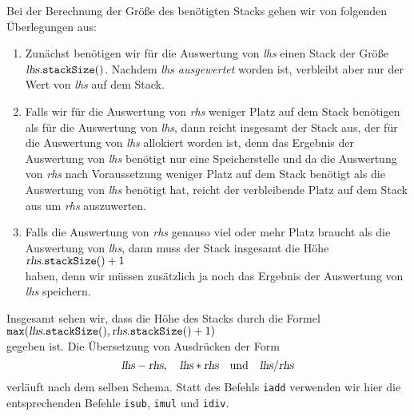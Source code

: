 Bei der Berechnung der Gr\"o{\ss}e des ben\"otigten Stacks gehen wir von folgenden \"Uberlegungen aus:
\begin{enumerate}
\item Zun\"achst ben\"otigen wir f\"ur die Auswertung von \textsl{lhs} einen Stack der Gr\"o{\ss}e
      $\textsl{lhs}.\mathtt{stackSize}()$.  Nachdem \textsl{lhs ausgewertet}  worden ist, verbleibt
      aber nur der Wert von \textsl{lhs} auf dem Stack.
\item Falls wir f\"ur die Auswertung von \textsl{rhs} weniger Platz auf dem Stack ben\"otigen als f\"ur
      die Auswertung von \textsl{lhs}, dann reicht insgesamt der Stack aus, der f\"ur die Auswertung
      von \textsl{lhs} allokiert worden ist, denn das Ergebnis der Auswertung von \textsl{lhs}
      ben\"otigt nur eine Speicherstelle und da die Auswertung von \textsl{rhs} nach Voraussetzung
      weniger Platz auf dem Stack ben\"otigt als die Auswertung von \textsl{lhs} ben\"otigt hat, reicht
      der verbleibende Platz auf dem Stack aus um \textsl{rhs} auszuwerten.
\item Falls die Auswertung von \textsl{rhs} genauso viel oder mehr Platz braucht als die Auswertung von \textsl{lhs},
      dann muss der Stack insgesamt die H\"ohe
      \\[0.2cm]
      \hspace*{1.3cm}
      $\textsl{rhs}.\texttt{stackSize}() + 1$
      \\[0.2cm]
      haben, denn wir m\"ussen zus\"atzlich ja noch das Ergebnis der Auswertung von \textsl{lhs} speichern.
\end{enumerate}
Insgesamt sehen wir, dass die H\"ohe des Stacks durch die Formel
\\[0.2cm]
\hspace*{1.3cm}
$\texttt{max}(\textsl{lhs}.\texttt{stackSize}(), \textsl{rhs}.\texttt{stackSize}() + 1)$
\\[0.2cm]
gegeben ist.
Die \"Ubersetzung von Ausdr\"ucken der Form 
\[ \textsl{lhs} - \textsl{rhs}, \quad\textsl{lhs} * \textsl{rhs} 
   \quad \mbox{und} \quad\textsl{lhs} / \textsl{rhs} 
\]
verl\"auft nach dem selben Schema.  Statt des Befehls \texttt{iadd} verwenden wir hier die
entsprechenden Befehle \texttt{isub}, \texttt{imul} und \texttt{idiv}.



